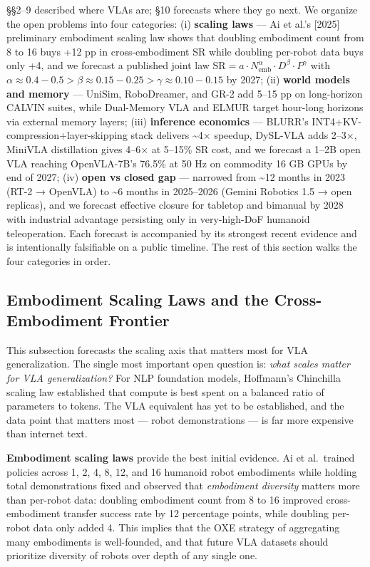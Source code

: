 \documentclass{article}
\begin{document}
§§2--9 described where VLAs are; §10 forecasts where they go next. We organize the open problems into four categories: (i) \textbf{scaling laws} --- Ai et al.'s {[}2025{]} preliminary embodiment scaling law shows that doubling embodiment count from 8 to 16 buys +12 pp in cross-embodiment SR while doubling per-robot data buys only +4, and we forecast a published joint law \(\text{SR} = a \cdot N_{\text{emb}}^{\alpha} \cdot D^{\beta} \cdot P^{\gamma}\) with \(\alpha \approx 0.4{-}0.5 > \beta \approx 0.15{-}0.25 > \gamma \approx 0.10{-}0.15\) by 2027; (ii) \textbf{world models and memory} --- UniSim, RoboDreamer, and GR-2 add 5--15 pp on long-horizon CALVIN suites, while Dual-Memory VLA \cite{li2026globalpriormeetslo} and ELMUR \cite{cherepanov2025elmurexternallayer} target hour-long horizons via external memory layers; (iii) \textbf{inference economics} --- BLURR's INT4+KV-compression+layer-skipping stack delivers \textasciitilde4× speedup, DySL-VLA adds 2--3×, MiniVLA distillation gives 4--6× at 5--15\% SR cost, and we forecast a 1--2B open VLA reaching OpenVLA-7B's 76.5\% at 50 Hz on commodity 16 GB GPUs by end of 2027; (iv) \textbf{open vs closed gap} --- narrowed from \textasciitilde12 months in 2023 (RT-2 → OpenVLA) to \textasciitilde6 months in 2025--2026 (Gemini Robotics 1.5 → open replicas), and we forecast effective closure for tabletop and bimanual by 2028 with industrial advantage persisting only in very-high-DoF humanoid teleoperation. Each forecast is accompanied by its strongest recent evidence and is intentionally falsifiable on a public timeline. The rest of this section walks the four categories in order.

\subsection{Embodiment Scaling Laws and the Cross-Embodiment Frontier}\label{embodiment-scaling-laws-and-the-cross-embodiment-frontier}

This subsection forecasts the scaling axis that matters most for VLA generalization. The single most important open question is: \emph{what scales matter for VLA generalization?} For NLP foundation models, Hoffmann's Chinchilla scaling law established that compute is best spent on a balanced ratio of parameters to tokens. The VLA equivalent has yet to be established, and the data point that matters most --- robot demonstrations --- is far more expensive than internet text.

\textbf{Embodiment scaling laws} \cite{ai2025towardsembodiments} provide the best initial evidence. Ai et al.~trained policies across 1, 2, 4, 8, 12, and 16 humanoid robot embodiments while holding total demonstrations fixed and observed that \emph{embodiment diversity} matters more than per-robot data: doubling embodiment count from 8 to 16 improved cross-embodiment transfer success rate by 12 percentage points, while doubling per-robot data only added 4. This implies that the OXE strategy of aggregating many embodiments is well-founded, and that future VLA datasets should prioritize diversity of robots over depth of any single one.
\end{document}
